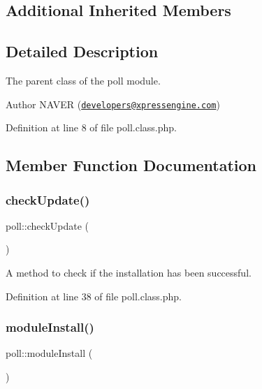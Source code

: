 \subsection*{Additional Inherited Members}


\subsection{Detailed Description}
The parent class of the poll module. 

\begin{DoxyAuthor}{Author}
N\+A\+V\+ER (\href{mailto:developers@xpressengine.com}{\tt developers@xpressengine.\+com}) 
\end{DoxyAuthor}


Definition at line 8 of file poll.\+class.\+php.



\subsection{Member Function Documentation}
\hypertarget{classpoll_a42546dbd4aeb7d1bc60a0353c5922f36}{}\label{classpoll_a42546dbd4aeb7d1bc60a0353c5922f36} 
\subsubsection{\texorpdfstring{check\+Update()}{checkUpdate()}}
{\footnotesize\ttfamily poll\+::check\+Update (\begin{DoxyParamCaption}{ }\end{DoxyParamCaption})}



A method to check if the installation has been successful. 



Definition at line 38 of file poll.\+class.\+php.

\hypertarget{classpoll_a21a07b0e65ffb1727542bb95a72386c9}{}\label{classpoll_a21a07b0e65ffb1727542bb95a72386c9} 
\subsubsection{\texorpdfstring{module\+Install()}{moduleInstall()}}
{\footnotesize\ttfamily poll\+::module\+Install (\begin{DoxyParamCaption}{ }\end{DoxyParamCaption})}



